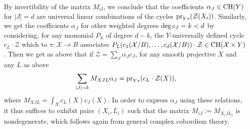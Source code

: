 \documentclass[10pt]{article}
\begin{document}
By invertibility of the matrix $M_{iI}$, we conclude that the coefficients $\alpha_J\in{\rm CH}(Y)$ for $|J|=d$ are
universal  linear combinations of the cycles ${\rm pr}_{Y*}(\mathcal{Z}(X_i))$.
Similarly, we get the coefficients  $\alpha_J$  for other weighted degrees ${\rm deg}\, c_J=k<d$ by considering,
for any monomial $P_L$ of degree $d-k$, the $Y$-universally defined cycle
$c_L\cdot \mathcal{Z}$ which to
$\pi:\mathcal{X}\rightarrow B$ associates
$P_L(c_{1}(\mathcal{X}/B),\ldots,c_{d}(\mathcal{X}/B))\cdot \mathcal{Z}\in{\rm CH}(\mathcal{X}\times Y)$.
Then we get as above that if $\mathcal{Z}=\sum_J \alpha_J c_J$, for any smooth projective
 $X$ and any $L$ as above
\begin{eqnarray} \label{eqformpoudesc2}\sum_{|J|=k}M_{XJL}\alpha_J ={\rm pr}_{Y*}(c_L\cdot \mathcal{Z}(X)),
\end{eqnarray}
where $M_{XJL}=\int_{X}c_L(X)c_J(X)$. In order to express $\alpha_J$ using these relations, it thus suffices to exhibit pairs $(X_i,L_i)$ such
that the matrix $M_{iJ}:=M_{X_iJL_i}$ is nondegenerate, which follows again from general complex cobordism theory.
\end{document}
